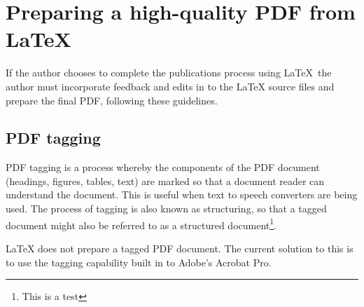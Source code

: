 \section{Preparing a high-quality PDF from LaTeX}\label{sec:PDFprep}
If the author chooses to complete the publications process using LaTeX\, the author must incorporate feedback and edits in to the LaTeX source files and prepare the final PDF, following these guidelines.

\subsection{PDF tagging}\label{sec:PDFtagging}
PDF tagging is a process whereby the components of the PDF document (headings, figures, tables, text) are marked so that a document reader can understand the document. This is useful when text to speech converters are being used. The process of tagging is also known as structuring, so that a tagged document might also be referred to as a structured document\footnote{This is a test}.

LaTeX does not prepare a tagged PDF document. The current solution to this is to use the tagging capability built in to Adobe's Acrobat Pro.

